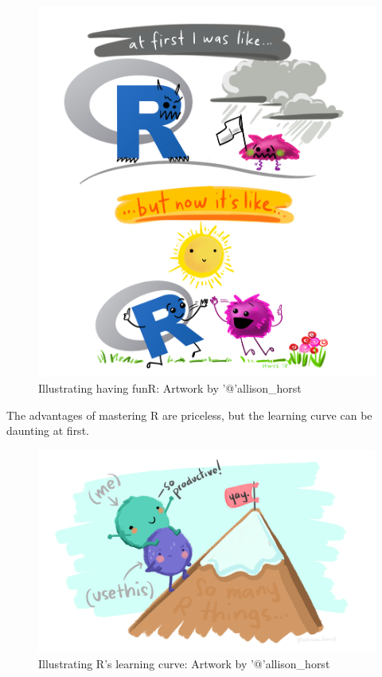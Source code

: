 \documentclass[
]{article}
\begin{document}
\begin{figure}
\centering
\includegraphics{extfiles/r_first_then.png}
\caption{Illustrating having funR: Artwork by '@'allison\_horst}
\end{figure}

The advantages of mastering R are priceless, but the learning curve can
be daunting at first.

\begin{figure}
\centering
\includegraphics{extfiles/usethis.png}
\caption{Illustrating R's learning curve: Artwork by '@'allison\_horst}
\end{figure}
\end{document}
